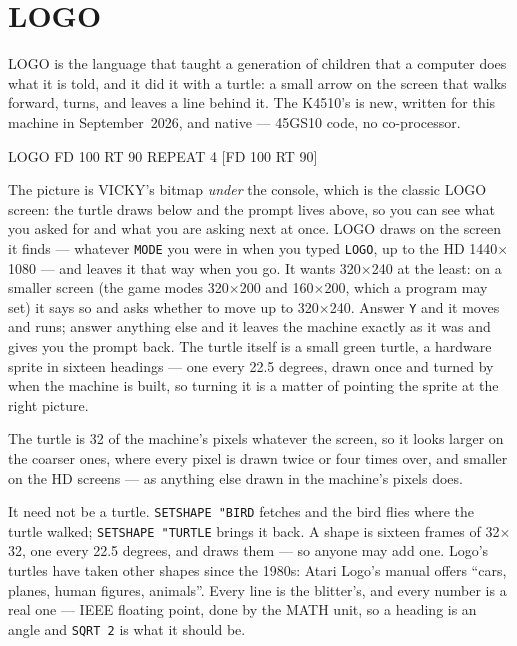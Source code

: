 \chapter{LOGO}\label{cha:logo}

LOGO is the language that taught a generation of children that a
computer does what it is told, and it did it with a turtle: a small
arrow on the screen that walks forward, turns, and leaves a line behind
it. The K4510's is new, written for this machine in September~2026, and
native --- 45GS10 code, no co-processor.

\begin{type}
LOGO
FD 100 RT 90
REPEAT 4 [FD 100 RT 90]
\end{type}


The picture is VICKY's bitmap \emph{under} the console, which is the
classic LOGO screen: the turtle draws below and the prompt lives above,
so you can see what you asked for and what you are asking next at once.
LOGO draws on the screen it finds --- whatever \verb|MODE| you were in
when you typed \verb|LOGO|, up to the HD 1440$\times$1080 --- and leaves
it that way when you go. It wants 320$\times$240 at the least: on a
smaller screen (the game modes 320$\times$200 and 160$\times$200, which a
program may set) it says so and asks whether to move up to
320$\times$240. Answer \texttt{Y} and it moves and runs; answer anything
else and it leaves the machine exactly as it was and gives you the
prompt back. The turtle
itself is a small green turtle, a hardware sprite in sixteen headings ---
one every 22.5 degrees, drawn once and turned by 
when the machine is built, so turning it is a matter of pointing the
sprite at the right picture.

The turtle is 32 of the machine's pixels whatever the screen, so it looks
larger on the coarser ones, where every pixel is drawn twice or four
times over, and smaller on the HD screens --- as anything else drawn in
the machine's pixels does.

It need not be a turtle. \verb|SETSHAPE "BIRD| fetches
 and the bird flies where the turtle walked;
\verb|SETSHAPE "TURTLE| brings it back. A shape is sixteen frames of
32$\times$32, one every 22.5 degrees, and  draws
them --- so anyone may add one. Logo's turtles have taken other shapes
since the 1980s: Atari Logo's manual offers ``cars, planes, human
figures, animals''.
Every line is the
blitter's, and every number is a real one --- IEEE floating point, done
by the MATH unit, so a heading is an angle and \verb|SQRT 2| is what it
should be.

